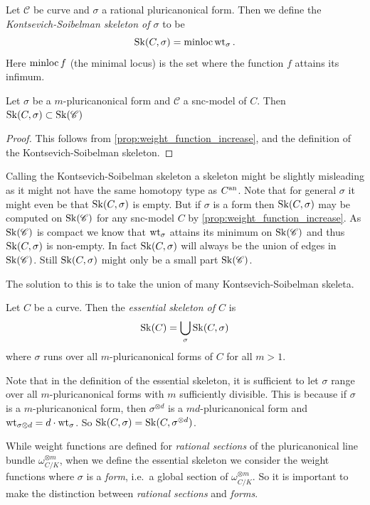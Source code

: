 \begin{definition}\label{def:KS_skeleton}
	Let $\mathscr C $ be curve and $\sigma$ a rational pluricanonical form. 
	Then we define the \emph{Kontsevich-Soibelman skeleton of $\sigma$} to be \[
		\operatorname{Sk}(C, \sigma) = \operatorname{minloc} \operatorname{wt}_{\sigma}
	.\]  
	Here $\operatorname{minloc} f$ (the minimal locus) is the set where the function $f$ attains its infimum.
\end{definition}
\begin{lemma}
	Let $\sigma$ be a $m$-pluricanonical form and $\mathscr C$ a snc-model of $C$. 
	Then $\operatorname{Sk}(C, \sigma) \subset  \operatorname{Sk}(\mathscr C)$
\end{lemma}
\begin{proof}
	This follows from \cref{prop:weight_function_increase}, and the definition of the Kontsevich-Soibelman skeleton. 
\end{proof}
Calling the Kontsevich-Soibelman skeleton a skeleton might be slightly misleading as it might not have the same homotopy type as $C{}^{\text{an}}$. 
Note that for general $\sigma$ it might even be that $\operatorname{Sk}(C, \sigma)$ is empty. 
But if $\sigma$ is a form then $\operatorname{Sk}(C, \sigma)$ may be computed on $\operatorname{Sk} (\mathscr C)$ for any snc-model $C$ by \cref{prop:weight_function_increase}. 
As $\operatorname{Sk}(\mathscr C)$ is compact we know that $\operatorname{wt}_{\sigma}$ attains its minimum on $\operatorname{Sk}(\mathscr C)$ and thus $\operatorname{Sk}(C, \sigma)$ is non-empty. 
In fact $\operatorname{Sk}(C, \sigma)$ will always be the union of edges in $\operatorname{Sk}(\mathscr C)$. 
Still $\operatorname{Sk}(C, \sigma)$ might only be a small part $\operatorname{Sk}(\mathscr C)$. 

The solution to this is to take the union of many Kontsevich-Soibelman skeleta.
\begin{definition}
	Let $C$ be a curve. 
	Then the \emph{essential skeleton of $C$} is \[
		\operatorname{Sk}(C) = \bigcup_{\sigma} \operatorname{Sk}(C, \sigma)
	\] 
	where $\sigma$ runs over all $m$-pluricanonical forms of $C$ for all $m > 1$. 
\end{definition}
\begin{remark}\label{rem:sufficiently_divisible_pluriconanonical}
	Note that in the definition of the essential skeleton, it is sufficient to let $\sigma$ range over all $m$-pluricanonical forms with $m$ sufficiently divisible. 
	This is because if $\sigma$ is a $m$-pluricanonical form, then $\sigma^{\otimes d}$ is a $md$-pluricanonical form and $\operatorname{wt}_{\sigma{\otimes d}} = d\cdot \operatorname{wt}_{\sigma}$. 
	So $\operatorname{Sk}(C, \sigma) = \operatorname{Sk}(C, \sigma^{\otimes d})$. 
\end{remark}
\begin{remark}
	While weight functions are defined for \emph{rational sections} of the pluricanonical line bundle $\omega_{C / K}^{\otimes m}$, when we define the essential skeleton we consider the weight functions where $\sigma$ is a \emph{form}, i.e.\ a global section of $\omega_{C / K} ^{\otimes m}$. 
	So it is important to make the distinction between \emph{rational sections} and \emph{forms}.
\end{remark}

